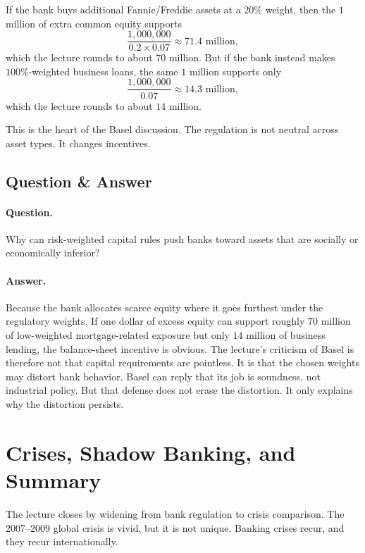 If the bank buys additional Fannie/Freddie assets at a \(20\%\) weight, then the \(1\) million of extra common equity supports
\begin{equation}
\frac{1{,}000{,}000}{0.2 \times 0.07} \approx 71.4\text{ million},
\end{equation}
which the lecture rounds to about \(70\) million. But if the bank instead makes \(100\%\)-weighted business loans, the same \(1\) million supports only
\begin{equation}
\frac{1{,}000{,}000}{0.07} \approx 14.3\text{ million},
\end{equation}
which the lecture rounds to about \(14\) million.

This is the heart of the Basel discussion. The regulation is not neutral across asset types. It changes incentives.

\subsection{Question \& Answer}

\paragraph{Question.} Why can risk-weighted capital rules push banks toward assets that are socially or economically inferior?

\paragraph{Answer.} Because the bank allocates scarce equity where it goes furthest under the regulatory weights. If one dollar of excess equity can support roughly \(70\) million of low-weighted mortgage-related exposure but only \(14\) million of business lending, the balance-sheet incentive is obvious. The lecture's criticism of Basel is therefore not that capital requirements are pointless. It is that the chosen weights may distort bank behavior. Basel can reply that its job is soundness, not industrial policy. But that defense does not erase the distortion. It only explains why the distortion persists.

\section{Crises, Shadow Banking, and Summary}

The lecture closes by widening from bank regulation to crisis comparison. The 2007--2009 global crisis is vivid, but it is not unique. Banking crises recur, and they recur internationally.

